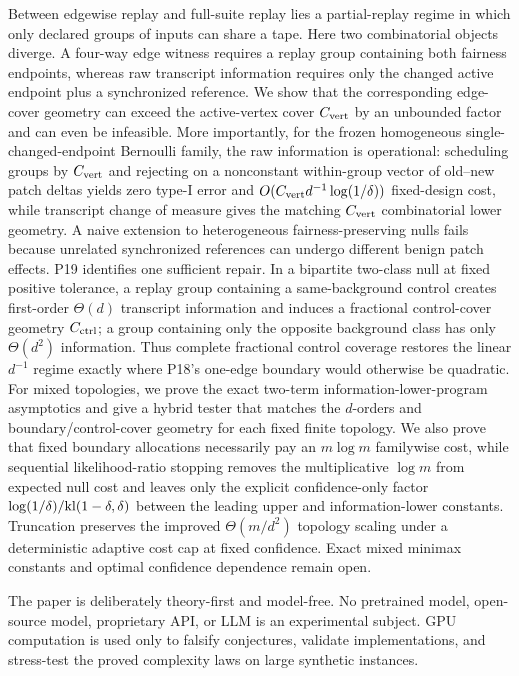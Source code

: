 Between edgewise replay and full-suite replay lies a partial-replay regime in
which only declared groups of inputs can share a tape.  Here two combinatorial
objects diverge.  A four-way edge witness requires a replay group containing both
fairness endpoints, whereas raw transcript information requires only the changed
active endpoint plus a synchronized reference.  We show that the corresponding
edge-cover geometry can exceed the active-vertex cover $C_{\rm vert}$ by an
unbounded factor and can even be infeasible.  More importantly, for the frozen
homogeneous single-changed-endpoint Bernoulli family, the raw information is
operational: scheduling groups by $C_{\rm vert}$ and rejecting on a nonconstant
within-group vector of old--new patch deltas yields zero type-I error and
$O(C_{\rm vert}d^{-1}\log(1/\delta))$ fixed-design cost, while transcript
change of measure gives the matching $C_{\rm vert}$ combinatorial lower
geometry.  A naive extension to heterogeneous fairness-preserving nulls fails because
unrelated synchronized references can undergo different benign patch effects.
P19 identifies one sufficient repair.  In a bipartite two-class null at fixed
positive tolerance, a replay group containing a same-background control creates
first-order $\Theta(d)$ transcript information and induces a fractional
control-cover geometry $C_{\rm ctrl}$; a group containing only the opposite
background class has only $\Theta(d^2)$ information.  Thus complete fractional
control coverage restores the linear $d^{-1}$ regime exactly where P18's
one-edge boundary would otherwise be quadratic.  For mixed topologies, we prove
the exact two-term information-lower-program asymptotics and give a hybrid tester
that matches the $d$-orders and boundary/control-cover geometry for each fixed
finite topology.  We also prove that fixed boundary allocations necessarily pay
an $m\log m$ familywise cost, while sequential likelihood-ratio stopping removes
the multiplicative $\log m$ from expected null cost and leaves only the explicit
confidence-only factor $\log(1/\delta)/\mathrm{kl}(1-\delta,\delta)$ between the leading
upper and information-lower constants.  Truncation preserves the improved
$\Theta(m/d^2)$ topology scaling under a deterministic adaptive cost cap at
fixed confidence.  Exact mixed minimax constants and optimal confidence
dependence remain open.

The paper is deliberately theory-first and model-free.  No pretrained model,
open-source model, proprietary API, or LLM is an experimental subject.  GPU
computation is used only to falsify conjectures, validate implementations, and
stress-test the proved complexity laws on large synthetic instances.


